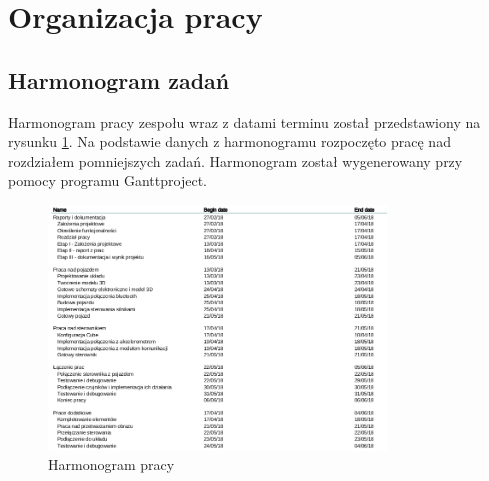 \documentclass[10pt, a4paper]{article}
\begin{document}
%
%
%
%
%

\newpage
\section{Organizacja pracy}
\subsection{Harmonogram zadań}
Harmonogram pracy zespołu wraz z datami terminu został przedstawiony na rysunku \ref{fig:Harmonogram}. Na podstawie danych z harmonogramu rozpoczęto pracę nad rozdziałem pomniejszych zadań. Harmonogram został wygenerowany przy pomocy programu Ganttproject.

\begin{figure}[H]
	\centering
	\includegraphics[width=0.8\textwidth]{Harm.png}
	\caption{Harmonogram pracy}
	\label{fig:Harmonogram}
\end{figure}
\end{document}
